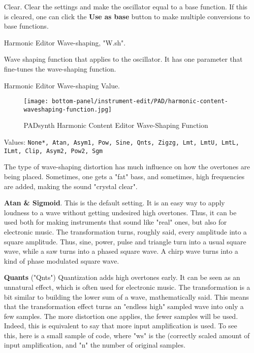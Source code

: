    Clear.
   Clear the settings and make the oscillator equal to a base function. If
   this is cleared, one can click the \textbf{Use as base} button to make
   multiple conversions to base functions. 

   Harmonic Editor Wave-shaping, "W.sh".

   Wave shaping function that applies to the oscillator.
   It has one parameter that fine-tunes the wave-shaping function. 

   Harmonic Editor Wave-shaping Value.

\begin{figure}[H]
   \centering 
   \texttt{[image: bottom-panel/instrument-edit/PAD/harmonic-content-waveshaping-function.jpg]}
   \caption{PADsynth Harmonic Content Editor Wave-Shaping Function}
   \label{fig:padsynth_harmonic_content_editor_waveshaping_function}
\end{figure}

   Values: \texttt{None*, Atan, Asym1, Pow, Sine, Qnts, Zigzg, Lmt,
              LmtU, LmtL, ILmt, Clip, Asym2, Pow2, Sgm}

   The type of wave-shaping distortion has much influence on how the
   overtones are being placed. Sometimes, one gets a "fat" bass, and
   sometimes, high frequencies are added, making the sound "crystal clear".

   \textbf{Atan \& Sigmoid}.
   This is the default setting. It is an easy way to apply loudness to a wave
   without getting undesired high overtones. Thus, it can be used both for
   making instruments that sound like "real" ones, but also for electronic
   music. The transformation turns, roughly said, every amplitude into a
   square amplitude. Thus, sine, power, pulse and triangle turn into a usual
   square wave, while a saw turns into a phased square wave. A chirp wave
   turns into a kind of phase modulated square wave.

   \textbf{Quants} ("Qnts")
   Quantization adds high overtones early. It can be seen as an unnatural
   effect, which is often used for electronic music.  The transformation is a
   bit similar to building the lower sum of a wave, mathematically said. This
   means that the transformation effect turns an "endless high" sampled
   wave into only a few samples. The more distortion one applies, the fewer
   samples will be used. Indeed, this is equivalent to say that more input
   amplification is used. To see this, here is a small sample of code, where
   "ws" is the (correctly scaled amount of input amplification, and "n" the
   number of original samples.

